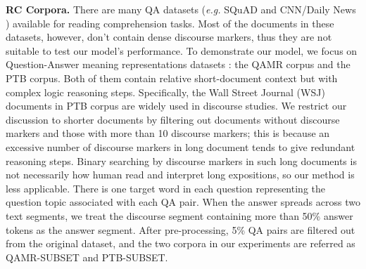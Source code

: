 \textbf{RC Corpora.}
There are many QA datasets (\textit{e.g.} SQuAD \cite{DBLP:conf/emnlp/RajpurkarZLL16,DBLP:conf/acl/RajpurkarJL18} and CNN/Daily
News \cite{DBLP:conf/nips/HermannKGEKSB15}) available for reading comprehension tasks. Most of the documents in these datasets, however, don't contain dense discourse markers, thus they are not suitable to test our model's performance. 
To demonstrate our model, we focus on Question-Answer meaning representations datasets \cite{DBLP:conf/naacl/MichaelSHDZ18}: the QAMR corpus and the PTB corpus. Both of them contain relative short-document context but with complex logic reasoning steps. Specifically, the Wall Street Journal (WSJ) documents in PTB corpus are widely used in discourse studies. We restrict our discussion to shorter documents by filtering out documents without discourse markers and those with more than 10 discourse markers; this is because an excessive number of discourse markers in long document tends to give redundant reasoning steps. Binary searching by discourse markers in such long documents is not necessarily how human read and interpret long expositions, so our method is less applicable.
There is one target word in each question representing the question topic associated with each QA pair. %
When the answer spreads across two text segments, we treat the discourse segment containing more than 50\% answer tokens as the answer segment.
After pre-processing, 5\% QA pairs are filtered out from the original dataset, and the two corpora in our experiments are referred as \textsc{QAMR-SUBSET} and \textsc{PTB-SUBSET}.
